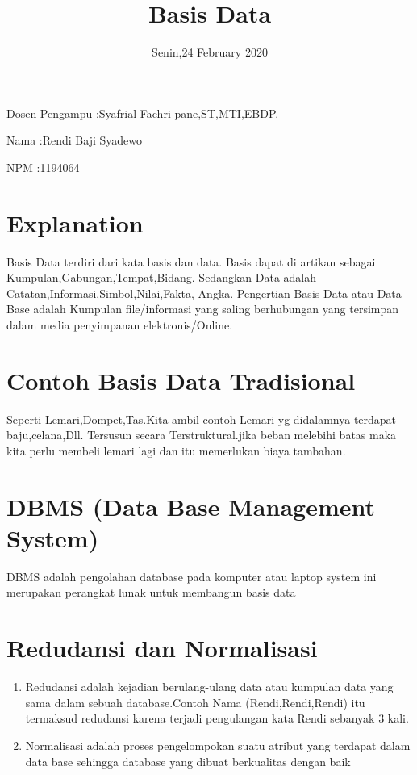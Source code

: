 \documentclass{article}
\title{Basis Data}
\author{ }
\date{Senin,24 February 2020}
\begin{document}
\maketitle
Dosen Pengampu :Syafrial Fachri pane,ST,MTI,EBDP.
\newline

Nama :Rendi Baji Syadewo
\newline

NPM :1194064
\section{Explanation}
Basis Data terdiri dari kata basis dan data.
Basis dapat di artikan  sebagai Kumpulan,Gabungan,Tempat,Bidang.
Sedangkan Data adalah Catatan,Informasi,Simbol,Nilai,Fakta,
Angka.
Pengertian Basis Data atau Data Base adalah Kumpulan file/informasi 
yang saling berhubungan yang tersimpan dalam media penyimpanan elektronis/Online.
\section{Contoh Basis Data Tradisional}
Seperti Lemari,Dompet,Tas.Kita ambil contoh Lemari yg didalamnya terdapat baju,celana,Dll.
Tersusun secara Terstruktural.jika beban melebihi batas maka kita perlu membeli lemari lagi dan itu memerlukan biaya tambahan.
\section{DBMS (Data Base Management System)}
DBMS adalah pengolahan database pada komputer atau laptop system ini merupakan perangkat lunak untuk membangun basis data
\section{Redudansi dan Normalisasi}
\begin{enumerate}
    \item 
Redudansi adalah kejadian berulang-ulang data atau kumpulan data   yang sama dalam sebuah database.Contoh Nama (Rendi,Rendi,Rendi) itu  termaksud redudansi karena terjadi pengulangan kata Rendi sebanyak   3 kali.
    \item
Normalisasi adalah proses pengelompokan suatu atribut yang terdapat dalam data base  sehingga  database yang dibuat berkualitas dengan baik

\end{enumerate}
\end{document}
